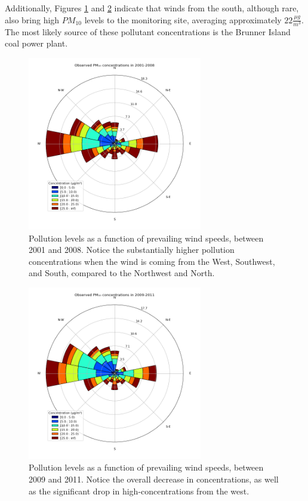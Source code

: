\documentclass[11pt,journal]{IEEEtran}
\begin{document}
Additionally, Figures \ref{windrose_1} and \ref{windrose_2} indicate that winds from the south, although rare, also bring high $PM_{10}$ levels to the monitoring site, averaging approximately $22 \frac{\mu g}{m^3}$. The most likely source of these pollutant concentrations is the Brunner Island coal power plant. 


\begin{figure}[!htbp]
\centering
\includegraphics[width=3in]{figs/windrose_2}
\caption{Pollution levels as a function of prevailing wind speeds, between 2001 and 2008. Notice the substantially higher pollution concentrations when the wind is coming from the West, Southwest, and South, compared to the Northwest and North.}
\label{windrose_1}
\end{figure}

\begin{figure}[!htbp]
\centering
\includegraphics[width=3in]{figs/windrose_3}
\caption{Pollution levels as a function of prevailing wind speeds, between 2009 and 2011. Notice the overall decrease in concentrations, as well as the significant drop in high-concentrations from the west.}
\label{windrose_2}
\end{figure}
\end{document}
